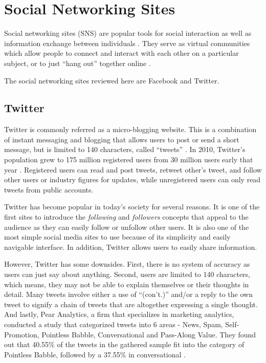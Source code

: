 \section{Social Networking Sites}
Social networking sites (SNS) are popular tools for social interaction as well as information exchange between individuals \cite{HughesRoweBateyLee2012}. They serve as virtual communities which allow people to connect and interact with each other on a  particular subject, or to just ``hang out'' together online \cite{CheungChiuLee2011}.

The social networking sites reviewed here are Facebook and Twitter.

\subsection{Twitter}
Twitter is commonly referred as a micro-blogging website. This is a combination of instant messaging and blogging that allows users to post or send a short message, but is limited to 140 characters, called ``tweets'' \cite{Crymble2010}. In 2010, Twitter's population grew to 175 million registered users from 30 million users early that year \cite{Rao2010}. Registered users can read and post tweets, retweet other's tweet, and follow other users or industry figures for updates, while unregistered users can only read tweets from public accounts.

Twitter has become popular in today's society for several reasons. It is one of the first sites to introduce the \textit{following} and \textit{followers} concepts that appeal to the audience as they can easily follow or unfollow other users. It is also one of the most simple social media sites to use because of its simplicity and easily navigable interface. In addition, Twitter allows users to easily share information.

However, Twitter has some downsides. First, there is no system of accuracy as users can just say about anything. Second, users are limited to 140 characters, which means, they may not be able to explain themselves or their thoughts in detail. Many tweets involve either a use of  ``(con't.)'' and/or a reply to the own tweet to signify a chain of tweets that are altogether expressing a single thought. And lastly, Pear Analytics, a firm that specializes in marketing analytics, conducted a study that categorized tweets into 6 areas - News, Spam, Self-Promotion, Pointless Babble, Conversational and Pass-Along Value. They found out that 40.55\% of the tweets in the gathered sample fit into the category of Pointless Babble, followed by a 37.55\% in conversational \cite{PearAnalytics2009}.

